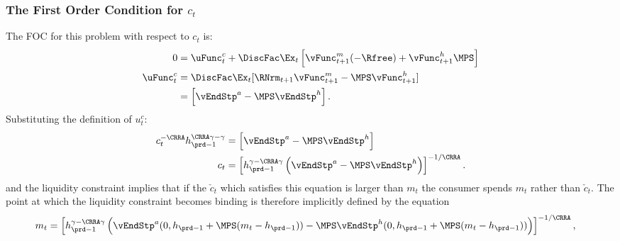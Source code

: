 \documentclass[\econtexRoot/SolvingMicroDSOPs]{subfiles}
\begin{document}
\subsubsection{The First Order Condition for $c_{t}$}
The FOC for this problem with respect to $c_{t}$ is:
\begin{equation}\begin{gathered}\begin{aligned}
  0  & = \uFunc^{c}_{t} + \DiscFac \Ex_{t} \left[{\vFunc}^{m}_{t+1}(-\Rfree)+{\vFunc}^{h}_{t+1} \MPS\right]  \\
  \uFunc^{c}_{t}  & = \DiscFac \Ex_{t} [\RNrm_{t+1} \vFunc_{t+1}^{m}-\MPS \vFunc_{t+1}^{h}] \label{eq:ctfoc}
  \\            & = \left[\vEndStp^{a}-\MPS \vEndStp^{h} \right].
\end{aligned}\end{gathered}\end{equation}
Substituting the definition of $u_{t}^{c}$:
\begin{equation}\begin{gathered}\begin{aligned}
  c_{t}^{-\CRRA}h_{\prd-1}^{\CRRA\gamma-\gamma}  & = \left[\vEndStp^{a}-\MPS \vEndStp^{h} \right]
  \\  c_{t}                                     & = \left[h_{\prd-1}^{\gamma-\CRRA\gamma} \left(\vEndStp^{a}-\MPS \vEndStp^{h} \right) \right]^{-1/\CRRA} \label{eq:habitsfoc}.
\end{aligned}\end{gathered}\end{equation}
and the liquidity constraint implies that if the $\check{c}_{t}$ which
satisfies this equation is larger than $m_{t}$ the consumer spends
$m_{t}$ rather than $\check{c}_{t}$.  The point at which the liquidity
constraint becomes binding is therefore implicitly defined by the equation
\begin{equation}\begin{gathered}\begin{aligned}
  m_{t}  & = \left[h_{\prd-1}^{\gamma-\CRRA\gamma} \left(\vEndStp^{a}(0,h_{\prd-1}+\MPS(m_{t}-h_{\prd-1}))-\MPS \vEndStp^{h}(0,h_{\prd-1}+\MPS(m_{t}-h_{\prd-1}))\right)  \right]^{-1/\CRRA}, \label{eq:LCbindsHabits}
\end{aligned}\end{gathered}\end{equation}
\end{document}
